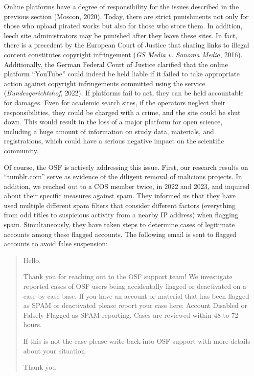 \documentclass[authordate, meta, issue]{jote-new-article}
\begin{document}
	Online platforms have a degree of responsibility for the issues described in the previous section (Moscon, 2020). Today, there are strict punishments not only for those who upload pirated works but also for those who store them. In addition, leech site administrators may be punished after they leave these sites. In fact, there is a precedent by the European Court of Justice that sharing links to illegal content constitutes copyright infringement (\emph{GS Media v. Sanoma Media}, 2016). Additionally, the German Federal Court of Justice clarified that the online platform “YouTube” could indeed be held liable if it failed to take appropriate action against copyright infringements committed using the service (\emph{Bundesgerichtshof}, 2022). If platforms fail to act, they can be held accountable for damages. Even for academic search sites, if the operators neglect their responsibilities, they could be charged with a crime, and the site could be shut down. This would result in the loss of a major platform for open science, including a huge amount of information on study data, materials, and registrations, which could have a serious negative impact on the scientific community.



	Of course, the OSF is actively addressing this issue. First, our research results on “tumblr.com” serve as evidence of the diligent removal of malicious projects. In addition, we reached out to a COS member twice, in 2022 and 2023, and inquired about their specific measures against spam. They informed us that they have used multiple different spam filters that consider different factors (everything from odd titles to suspicious activity from a nearby IP address) when flagging spam. Simultaneously, they have taken steps to determine cases of legitimate accounts among these flagged accounts. The following email is sent to flagged accounts to avoid false suspension:


	\begin{quotation}
		
	Hello,



	Thank you for reaching out to the OSF support team! We investigate reported cases of OSF users being accidentally flagged or deactivated on a case-by-case base. If you have an account or material that has been flagged as SPAM or deactivated please report your case here: Account Disabled or Falsely Flagged as SPAM reporting. Cases are reviewed within 48 to 72 hours.







	If this is not the case please write back into OSF support with more details about your situation.



	Thank you
	\end{quotation}
\end{document}

